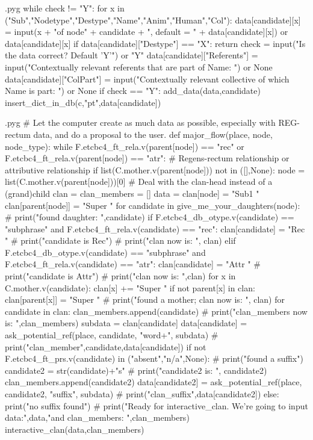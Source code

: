 \documentclass{report}
\makeatletter
\newenvironment{python}{%
  \VerbatimEnvironment
  \minted@resetoptions
  \setkeys{minted@opt}{}
      \begin{VerbatimOut}{\jobname.pyg}}
{%
      \end{VerbatimOut}
      \minted@pygmentize{python}
      \DeleteFile{\jobname.pyg}}
\makeatother
\begin{document}
\begin{python}
        while check != "Y":
            for x in ("Sub","Nodetype","Destype","Name","Anim","Human","Col"):
                data[candidate][x] = input(x + "of node" + candidate + ", default = " + data[candidate][x]) or data[candidate][x] 
                if data[candidate]["Destype"] == "X":
                    return
            check = input("Is the data correct? Default 'Y'") or "Y"
        data[candidate]["Referents"] = input("Contextually relevant referents that are part of Name: ") or None
        data[candidate]["ColPart"] = input("Contextually relevant collective of which Name is part: ") or None
        if check == "Y":
            add_data(data,candidate)
            insert_dict_in_db(c,"pt",data[candidate])

\end{python}

\begin{python}
# Let the computer create as much data as possible, especially with REG-rectum data, and do a proposal to the user.
def major_flow(place, node, node_type):
    while F.etcbc4_ft_rela.v(parent[node]) == "rec" or F.etcbc4_ft_rela.v(parent[node]) == "atr": # Regens-rectum relationship or attributive relationship
        if list(C.mother.v(parent[node])) not in ([],None):
            node = list(C.mother.v(parent[node]))[0] # Deal with the clan-head instead of a (grand)child
    clan = {}
    clan_members = []
    data = {}
    clan[node] = "Sub1 "
    clan[parent[node]] = "Super "
    for candidate in give_me_your_daughters(node):
#        print("found daughter: ",candidate)
        if F.etcbc4_db_otype.v(candidate) == "subphrase" and F.etcbc4_ft_rela.v(candidate) == "rec":
            clan[candidate] = "Rec "
#            print("candidate is Rec")
#            print("clan now is: ", clan)
        elif F.etcbc4_db_otype.v(candidate) == "subphrase" and F.etcbc4_ft_rela.v(candidate) == "atr":
            clan[candidate] = "Attr "
#            print("candidate is Attr")
#            print("clan now is: ",clan)
        for x in C.mother.v(candidate):
            clan[x] += "Super "
            if not parent[x] in clan:
                clan[parent[x]] = "Super "
#            print("found a mother; clan now is: ", clan)
    for candidate in clan:
        clan_members.append(candidate)
#        print("clan_members now is: ",clan_members)
        subdata = clan[candidate]
        data[candidate] = ask_potential_ref(place, candidate, "word+", subdata)
#        print("clan_member",candidate,data[candidate])
        if not F.etcbc4_ft_prs.v(candidate) in ("absent","n/a",None):
#            print("found a suffix")
            candidate2 = str(candidate)+"s"
#            print("candidate2 is: ", candidate2)
            clan_members.append(candidate2)
            data[candidate2] = ask_potential_ref(place, candidate2, "suffix", subdata)
#            print("clan_suffix",data[candidate2])
        else:
            print("no suffix found")
#    print("Ready for interactive_clan. We're going to input data:",data,"and clan_members: ",clan_members)
    interactive_clan(data,clan_members)

\end{python}
\end{document}

